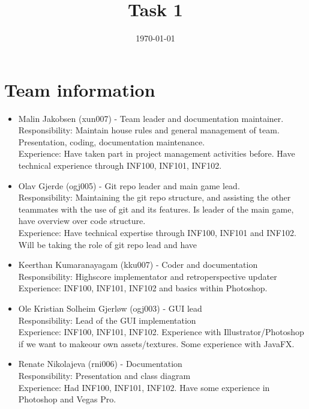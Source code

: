 \documentclass[12pt]{article}%
\begin{document}
\title{Task 1}
\date{\today}
\maketitle
\section{Team information}




\begin{itemize}
\item Malin Jakobsen (xun007) - Team leader and documentation maintainer. \\
Responsibility: Maintain house rules and general management of team. Presentation, coding, documentation maintenance. \\
	Experience: Have taken part in project management activities before. Have technical
experience through INF100, INF101, INF102.

\item Olav Gjerde (ogj005) - Git repo leader and main game lead. \\
Responsibility: Maintaining the git repo structure, and assisting the other teammates
with the use of git and its features. Is leader of the main game, have overview over code structure. \\
Experience: Have technical expertise through INF100, INF101 and INF102. Will be
taking the role of git repo lead and have
\item Keerthan Kumaranayagam (kku007) -  Coder and documentation\\
Responsibility: Highscore implementator and retroperspective updater\\
Experience: INF100, INF101, INF102 and basics within Photoshop.
\item Ole Kristian Solheim Gjerløw (ogj003) - GUI lead\\
Responsibility: Lead of the GUI implementation\\
Experience: INF100, INF101, INF102. Experience with Illustrator/Photoshop if we want to makeour own assets/textures. Some experience with JavaFX.
\item Renate Nikolajeva (rni006) - Documentation\\
Responsibility: Presentation and class diagram\\
	Experience: Had INF100, INF101, INF102. Have some experience in Photoshop and
Vegas Pro.


\end{itemize}
\end{document}
